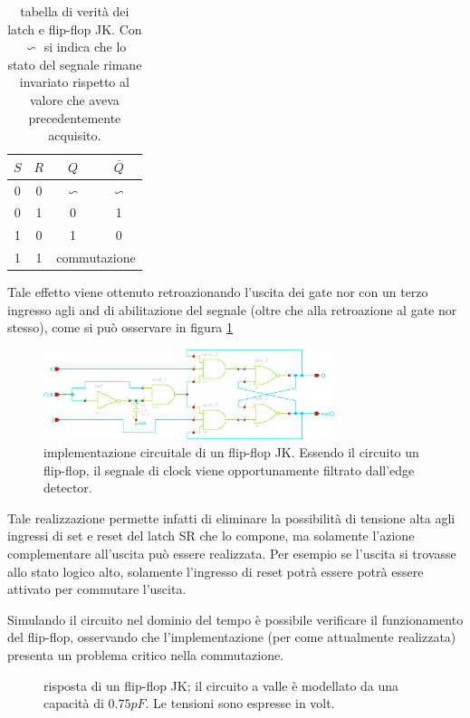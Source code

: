 	\begin{table}[bht]
		\centering
		\begin{tabular}{c c | c c }
			$S$ & $R$ & $Q$ & $\overline Q$ \\ \hline
			0 & 0 & $\backsim$ & $\backsim$ \\
			0 & 1 & 0 & 1 \\
			1 & 0 & 1 & 0 \\
			1 & 1 & \multicolumn{2}{c}{commutazione} 		
		\end{tabular}
		\caption{tabella di verità dei latch e flip-flop JK. Con $\backsim$ si indica che lo stato del segnale rimane invariato rispetto al valore che aveva precedentemente acquisito.}
		\label{tab:jkl:tabellaverita}
	\end{table}
	
	Tale effetto viene ottenuto retroazionando l'uscita dei gate nor con un terzo ingresso agli and di abilitazione del segnale (oltre che alla retroazione al gate nor stesso), come si può osservare in figura \ref{fig:jkff:schema}
	
	\begin{figure}[bht]
		\centering
		\includegraphics[width=8.5cm]{Immagini/jk-flipflop}
		\caption{implementazione circuitale di un flip-flop JK. Essendo il circuito un flip-flop, il segnale di clock viene opportunamente filtrato dall'edge detector.}
		\label{fig:jkff:schema}
	\end{figure}
	Tale realizzazione permette infatti di eliminare la possibilità di tensione alta agli ingressi di set e reset del latch SR che lo compone, ma solamente l'azione complementare all'uscita può essere realizzata. Per esempio se l'uscita si trovasse allo stato logico alto, solamente l'ingresso di reset potrà essere potrà essere attivato per commutare l'uscita.
	
	Simulando il circuito nel dominio del tempo è possibile verificare il funzionamento del flip-flop, osservando che l'implementazione (per come attualmente realizzata) presenta un problema critico nella commutazione.
	
	\begin{figure}[bht]
		\centering
		
		\caption{risposta di un flip-flop JK; il circuito a valle è modellato da una capacità di $0.75pF$. Le tensioni sono espresse in volt.}
		\label{fig:jkff:sim-instabile}
	\end{figure}
	
